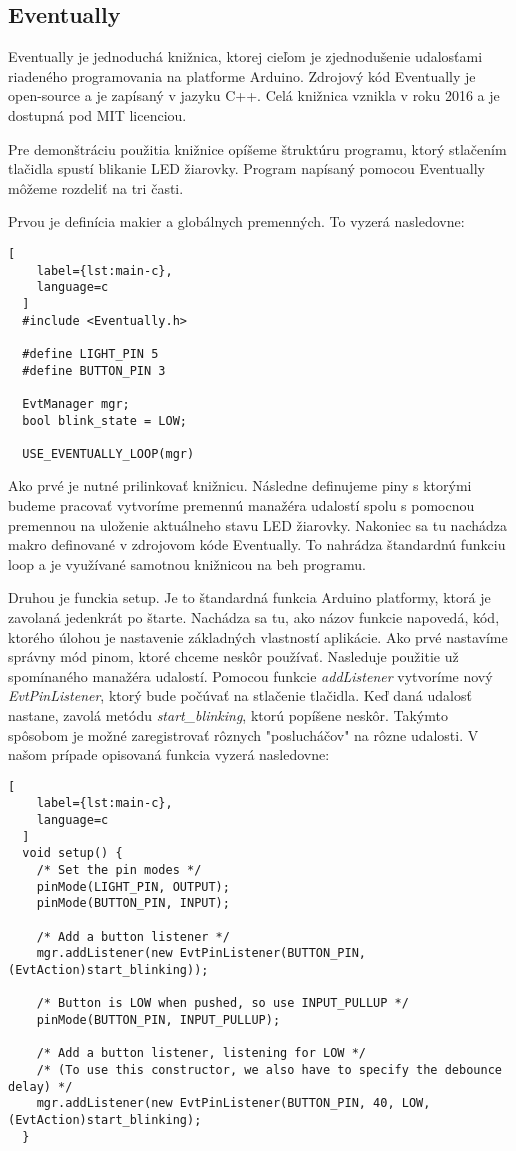 \subsection{Eventually}
\noindent Eventually je jednoduchá knižnica, ktorej cieľom je zjednodušenie udalosťami riadeného 
programovania na platforme Arduino. Zdrojový kód Eventually je open-source a je zapísaný v jazyku C++. Celá knižnica vznikla v roku 2016 a je dostupná pod MIT licenciou.
\par Pre demonštráciu použitia knižnice opíšeme štruktúru programu, ktorý stlačením tlačidla spustí blikanie LED žiarovky. Program napísaný pomocou Eventually môžeme rozdeliť na tri časti.

\par Prvou je definícia makier a globálnych premenných. To vyzerá nasledovne: 
\begin{lstlisting}[
    label={lst:main-c},
    language=c
  ]  
  #include <Eventually.h>

  #define LIGHT_PIN 5
  #define BUTTON_PIN 3
  
  EvtManager mgr;
  bool blink_state = LOW;

  USE_EVENTUALLY_LOOP(mgr)
\end{lstlisting}

Ako prvé je nutné prilinkovať knižnicu. Následne definujeme piny s ktorými budeme pracovať vytvoríme premennú manažéra udalostí spolu s pomocnou premennou na uloženie aktuálneho stavu LED žiarovky. Nakoniec sa tu nachádza makro definované v zdrojovom kóde Eventually. To nahrádza štandardnú funkciu loop a je využívané samotnou knižnicou na beh programu.

\par Druhou je funckia setup. Je to štandardná funkcia Arduino platformy, ktorá je zavolaná 
jedenkrát po štarte. Nachádza sa tu, ako názov funkcie napovedá, kód, ktorého úlohou je 
nastavenie základných vlastností aplikácie. Ako prvé nastavíme správny mód pinom, ktoré chceme neskôr používať. Nasleduje použitie už
spomínaného manažéra udalostí. Pomocou funkcie \textit{addListener} vytvoríme nový \textit{EvtPinListener}, ktorý bude počúvať na stlačenie tlačidla. Keď daná udalosť nastane, zavolá metódu \textit{start\_blinking}, ktorú popíšene neskôr. Takýmto spôsobom je možné zaregistrovať rôznych "poslucháčov" na rôzne udalosti. V našom prípade opisovaná funkcia vyzerá nasledovne: 

\begin{lstlisting}[
    label={lst:main-c},
    language=c
  ]  
  void setup() {
    /* Set the pin modes */
    pinMode(LIGHT_PIN, OUTPUT);
    pinMode(BUTTON_PIN, INPUT);
  
    /* Add a button listener */
    mgr.addListener(new EvtPinListener(BUTTON_PIN, (EvtAction)start_blinking));

    /* Button is LOW when pushed, so use INPUT_PULLUP */
    pinMode(BUTTON_PIN, INPUT_PULLUP);

    /* Add a button listener, listening for LOW */
    /* (To use this constructor, we also have to specify the debounce delay) */
    mgr.addListener(new EvtPinListener(BUTTON_PIN, 40, LOW, (EvtAction)start_blinking);
  }
\end{lstlisting}

